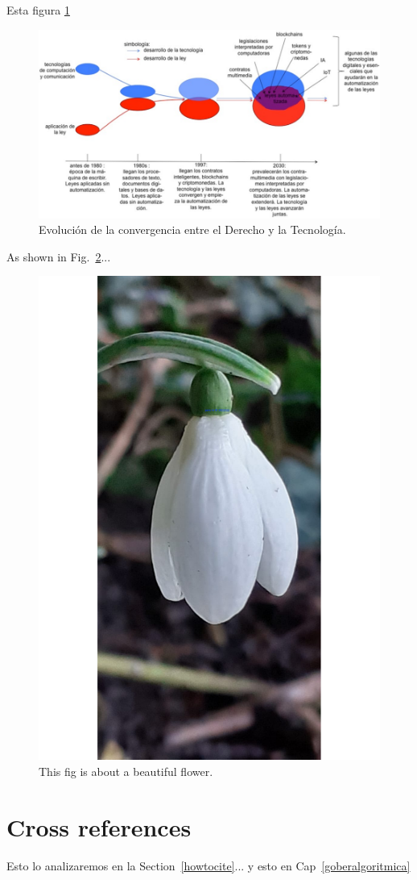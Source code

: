 \documentclass[12pt]{report} %
\begin{document}
Esta figura \ref{fig:convergencia}

\begin{figure}
\centering
\includegraphics[width=1.0\columnwidth]{imagenes/convergencia.pdf}
\caption{Evolución de la convergencia entre el Derecho y la Tecnología.}
\label{fig:convergencia}
\end{figure}



As shown in Fig.~\ref{fig:sd}...

\begin{figure}
\centering
\includegraphics[width=0.45\columnwidth]{imagenes/SnowDrop30Dec2022.pdf}
\caption{This fig is about a beautiful flower.}
\label{fig:sd}
\end{figure}



\section{Cross references}
Esto lo analizaremos en la Section~\ref{howtocite}...
y esto en Cap~\ref{goberalgoritmica}
\end{document}
